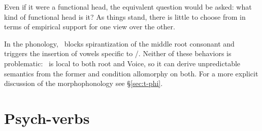 Even if it were a functional head, the equivalent question would be asked: what kind of functional head is it? As things stand, there is little to choose from in terms of empirical support for one view over the other.

In the phonology, \va~blocks spirantization of the middle root consonant and triggers the insertion of vowels specific to \tpie/\thit. Neither of these behaviors is problematic: \va~is local to both root and Voice, so it can derive unpredictable semantics from the former and condition allomorphy on both. For a more explicit discussion of the morphophonology see \S\ref{sec:t-phi}.


\section{Psych-verbs}